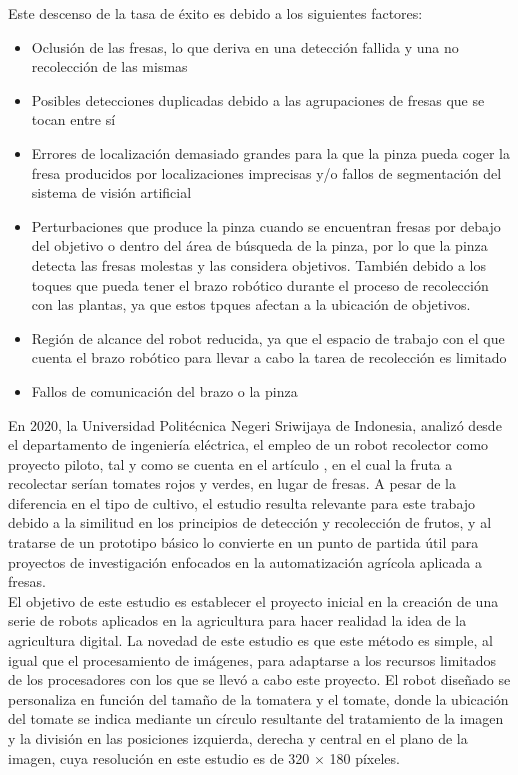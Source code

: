 Este descenso de la tasa de éxito es debido a los siguientes factores:

\begin{itemize}
    \item Oclusión de las fresas, lo que deriva en una detección fallida y una no recolección de las mismas
    \item Posibles detecciones duplicadas debido a las agrupaciones de fresas que se tocan entre sí
    \item Errores de localización demasiado grandes para la que la pinza pueda coger la fresa producidos por localizaciones imprecisas y/o fallos de segmentación del sistema de visión artificial
    \item Perturbaciones que produce la pinza cuando se encuentran fresas por debajo del objetivo o dentro del área de búsqueda de la pinza, por lo que la pinza detecta las fresas molestas y las considera objetivos. También debido a los toques que pueda tener el brazo robótico durante el proceso de recolección con las plantas, ya que estos tpques afectan a la ubicación de objetivos.
    \item Región de alcance del robot reducida, ya que el espacio de trabajo con el que cuenta el brazo robótico para llevar a cabo la tarea de recolección es limitado
    \item Fallos de comunicación del brazo o la pinza
\end{itemize}

En 2020, la Universidad Politécnica Negeri Sriwijaya de Indonesia, analizó desde el departamento de ingeniería eléctrica, el empleo de un robot recolector como proyecto piloto, tal y como se cuenta en el artículo \cite{Oktarina20}, en el cual la fruta a recolectar serían tomates rojos y verdes, en lugar de fresas. A pesar de la diferencia en el tipo de cultivo, el estudio resulta relevante para este trabajo debido a la similitud en los principios de detección y recolección de frutos, y al tratarse de un prototipo básico lo convierte en un punto de partida útil para proyectos de investigación enfocados en la automatización agrícola aplicada a fresas.\\

El objetivo de este estudio es establecer el proyecto inicial en la creación de una serie de robots aplicados en la agricultura para hacer realidad la idea de la agricultura digital. La novedad de este estudio es que este método es simple, al igual que el procesamiento de imágenes, para adaptarse a los recursos limitados de los procesadores con los que se llevó a cabo este proyecto. El robot diseñado se personaliza en función del tamaño de la tomatera y el tomate, donde la ubicación del tomate se indica mediante un círculo resultante del tratamiento de la imagen y la división en las posiciones izquierda, derecha y central en el plano de la imagen, cuya resolución en este estudio es de 320 × 180 píxeles. 

